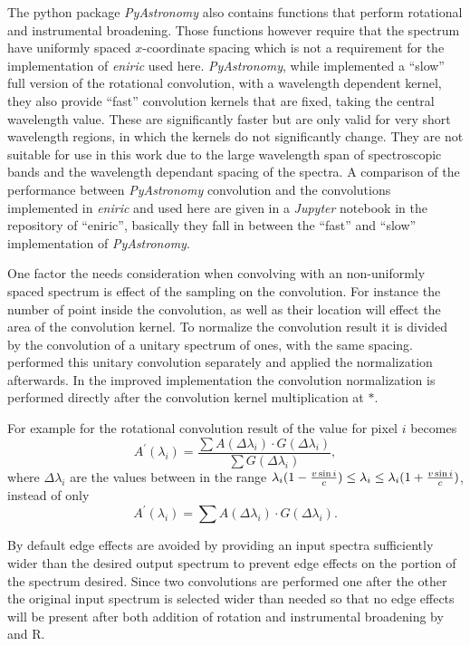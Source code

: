 The python package \emph{PyAstronomy} also contains functions that perform rotational and instrumental broadening.
Those functions however require that the spectrum have uniformly spaced $x$-coordinate spacing which is not a requirement for the implementation of \emph{eniric} used here.
\emph{PyAstronomy}, while implemented a ``slow'' full version of the rotational convolution, with a wavelength dependent kernel, they also provide ``fast'' convolution kernels that are fixed, taking the central wavelength value.
These are significantly faster but are only valid for very short wavelength regions, in which the kernels do not significantly change.
They are not suitable for use in this work due to the large wavelength span of spectroscopic bands and the wavelength dependant spacing of the spectra.
A comparison of the performance between \emph{PyAstronomy} convolution and the convolutions implemented in \emph{eniric} and used here are given in a \emph{Jupyter} notebook in the repository of ``eniric'', basically they fall in between the ``fast'' and ``slow'' implementation of \emph{PyAstronomy}.

One factor the needs consideration when convolving with an non-uniformly spaced spectrum is effect of the sampling on the convolution.
For instance the number of point inside the convolution, as well as their location will effect the area of the convolution kernel.
To normalize the convolution result it is divided by the convolution of a unitary spectrum of ones, with the same spacing.
\citet{figueira_radial_2016} performed this unitary convolution separately and applied the normalization afterwards.
In the improved implementation the convolution normalization is performed directly after the convolution kernel multiplication at \(\textbf{*}\).

For example for the rotational convolution result of the value for pixel $i$ becomes
\[{A}^{\prime}(\lambda_{i}) =  \frac{\sum A(\Delta\lambda_{i}) \cdot G(\Delta\lambda_{i})}{\sum G(\Delta\lambda_{i})},\]
where $\Delta\lambda_{i}$ are the values between in the range $\lambda_{i} (1-\frac{v\sin{i}}{c}) \le\lambda_{i} \le \lambda_{i} (1+ \frac{v\sin{i}}{c})$,
instead of only
\[{A}^{\prime}(\lambda_{i}) =  \sum A(\Delta\lambda_{i}) \cdot G(\Delta\lambda_{i}).\]


By default edge effects are avoided by providing an input spectra sufficiently wider than the desired output spectrum to prevent edge effects on the portion of the spectrum desired.
Since two convolutions are performed one after the other the original input spectrum is selected wider than needed so that no edge effects will be present after both addition of rotation and instrumental broadening by \Vsini{} and R.

